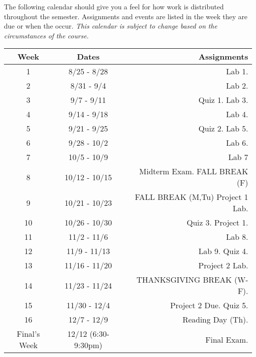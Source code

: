 \documentclass[10pt]{article}
\begin{document}
The following calendar should give you a feel for how work is distributed throughout the semester.  Assignments and events are listed in the week they are due or when the occur. \textit{This calendar is subject to change based on the circumstances of the course.}

\begin{center}
\begin{tabular}{|c|c|r|}
\hline 
Week & Dates & Assignments \\
\hline
1 & 8/25 - 8/28 &  Lab 1. \\
\hline 
2 & 8/31 - 9/4 &   Lab 2. \\
\hline
3 & 9/7 - 9/11 &   Quiz 1. Lab 3.\\
\hline
4 & 9/14 - 9/18 &  Lab 4. \\
\hline
5 & 9/21 - 9/25 &  Quiz 2. Lab 5.\\
\hline
6 & 9/28 - 10/2 & Lab 6.\\
\hline
7 & 10/5 - 10/9  &  Lab 7\\
\hline 
8 & 10/12 - 10/15 &  Midterm Exam. FALL BREAK (F) \\
\hline
9 & 10/21 - 10/23 & FALL BREAK (M,Tu)  Project 1 Lab.\\
\hline
10 & 10/26 - 10/30 &  Quiz 3. Project 1.\\
\hline
11 & 11/2 - 11/6 & Lab 8.\\
\hline
12 & 11/9 - 11/13 & Lab 9. Quiz 4.\\
\hline
13 & 11/16 - 11/20 & Project 2 Lab.\\ 
\hline
14 & 11/23 - 11/24 &  THANKSGIVING BREAK (W-F).   \\
\hline
15 & 11/30 - 12/4 & Project 2 Due. Quiz 5.\\ 
\hline
16 & 12/7 - 12/9 &   Reading Day (Th). \\
\hline
Final's Week & 12/12 (6:30-9:30pm) & Final Exam. \\ 
\hline
\end{tabular}
\end{center}
\end{document}
